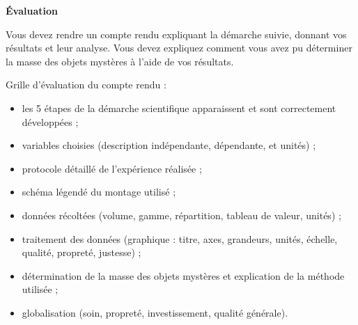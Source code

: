 \begin{TP}
\vspace{3em}

\textbf{Évaluation}

\vspace{1em}

Vous devez rendre un compte rendu expliquant la démarche suivie, donnant vos résultats et leur analyse. Vous devez expliquez comment vous avez pu déterminer la masse des objets mystères à l'aide de vos résultats.

\vspace{1em}

Grille d'évaluation du compte rendu :
\begin{itemize}
\item les 5 étapes de la démarche scientifique apparaissent et sont correctement développées ;
\item variables choisies (description indépendante, dépendante, et unités) ;
\item protocole détaillé de l'expérience réalisée ;
\item schéma légendé du montage utilisé ;
\item données récoltées (volume, gamme, répartition, tableau de valeur, unités) ;
\item traitement des données (graphique : titre, axes, grandeurs, unités, échelle, qualité, propreté, justesse) ;
\item détermination de la masse des objets mystères et explication de la méthode utilisée ;
\item globalisation (soin, propreté, investissement, qualité générale).
\end{itemize}





\end{TP}
